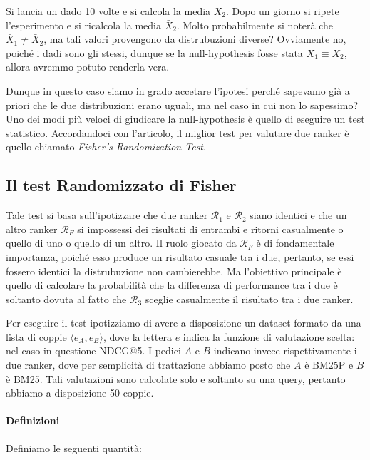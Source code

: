 \begin{esempio}
	Si lancia un dado 10 volte e si calcola la media $\bar{X}_2$. Dopo un giorno si ripete l'esperimento
	e si ricalcola la media $\bar{X}_2$. Molto probabilmente si noterà che $\bar{X}_1 \neq \bar{X}_2$,
	ma tali valori provengono da distrubuzioni diverse?
	Ovviamente no, poiché i dadi sono gli stessi, dunque se la null-hypothesis fosse
	stata $X_1 \equiv X_2$, allora avremmo potuto renderla vera.
\end{esempio}

Dunque in questo caso siamo in grado accetare l'ipotesi perché
sapevamo già a priori che le due distribuzioni erano uguali, ma nel caso
in cui non lo sapessimo?
Uno dei modi più veloci di giudicare la null-hypothesis è quello di eseguire un test statistico.
Accordandoci con l'articolo\cite{10.1145/1321440.1321528}, il miglior test per valutare
due ranker è quello chiamato \textit{Fisher's Randomization Test}.

\subsection{Il test Randomizzato di Fisher}
Tale test si basa sull'ipotizzare che due ranker $\mathcal{R}_1 $ e $\mathcal{R}_2$ siano identici
e che un altro ranker $\mathcal{R}_F$ si impossessi dei risultati di entrambi e
ritorni casualmente o quello di uno o quello di un altro.
Il ruolo giocato da $\mathcal{R}_F$ è di fondamentale importanza, poiché esso produce un risultato
casuale tra i due, pertanto, se essi fossero identici la distrubuzione non cambierebbe.
Ma l'obiettivo principale è quello di calcolare la probabilità che la differenza
di performance tra i due è soltanto dovuta al fatto che $\mathcal{R}_3$ sceglie casualmente
il risultato tra i due ranker.

Per eseguire il test ipotizziamo di avere a disposizione un dataset formato da una lista
di coppie $\langle e_{A}, e_{B}\rangle$, dove la lettera $e$ indica la funzione di valutazione
scelta: nel caso in questione NDCG@5. I pedici $A$ e $B$ indicano invece rispettivamente i due
ranker, dove per semplicità di trattazione abbiamo posto che $A$ è BM25P e $B$ è BM25. Tali valutazioni sono calcolate solo e soltanto su una query,
pertanto abbiamo a disposizione 50 coppie.

\paragraph{Definizioni}
Definiamo le seguenti quantità:

